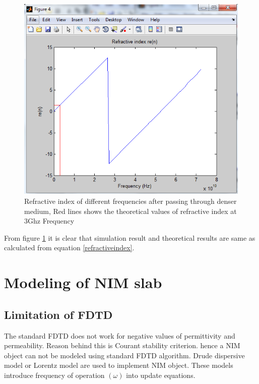 \begin{figure}[htbp]
	\centering
		\includegraphics[width=5in]{Figures/ri1.png}
	\caption[Refractive index of different frequencies after passing through denser medium]{Refractive index of different frequencies after passing through denser medium, Red lines shows the theoretical values of refractive index at 3Ghz Frequency}
	\label{fig:ri1}
\end{figure}
From figure \ref{fig:ri1} it is clear that simulation result and theoretical results are same as calculated from equation \eqref{refractiveindex}.
\section{Modeling of NIM slab }
\subsection{Limitation of FDTD}
The standard FDTD does not work for negative values of permittivity and permeability. Reason behind this is Courant stability criterion. hence a NIM object can not be modeled using standard FDTD algorithm. Drude dispersive model or Lorentz model are used to implement NIM object. These models introduce frequency of operation $(\omega)$ into update equations.
